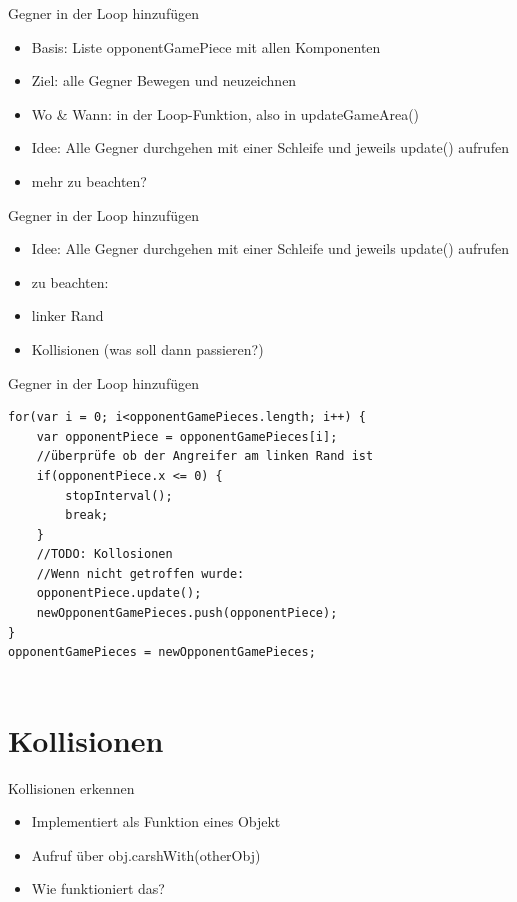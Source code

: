 \documentclass[18pt]{beamer}
\begin{document}
\begin{frame}{Gegner in der Loop hinzufügen}
\begin{itemize}
	\item Basis: Liste opponentGamePiece mit allen Komponenten
	\item Ziel: alle Gegner Bewegen und neuzeichnen 
	\item Wo \& Wann: in der Loop-Funktion, also in updateGameArea()
	\item Idee: Alle Gegner durchgehen mit einer Schleife und jeweils update() aufrufen
	\item mehr zu beachten? 
\end{itemize}
\end{frame}

\begin{frame}{Gegner in der Loop hinzufügen}
\begin{itemize}
	\item Idee: Alle Gegner durchgehen mit einer Schleife und jeweils update() aufrufen
	\item zu beachten:
	\item linker Rand
	\item Kollisionen (was soll dann passieren?) 
\end{itemize}
\end{frame}

\begin{frame}[fragile]{Gegner in der Loop hinzufügen}
\begin{lstlisting}	
for(var i = 0; i<opponentGamePieces.length; i++) {
	var opponentPiece = opponentGamePieces[i];
	//überprüfe ob der Angreifer am linken Rand ist
	if(opponentPiece.x <= 0) {
		stopInterval();
		break;
	}
	//TODO: Kollosionen
	//Wenn nicht getroffen wurde: 
	opponentPiece.update();
	newOpponentGamePieces.push(opponentPiece);
}
opponentGamePieces = newOpponentGamePieces;
	
\end{lstlisting}
\end{frame}

\section{Kollisionen}
\begin{frame}{Kollisionen erkennen}
\begin{itemize}
	\item Implementiert als Funktion eines Objekt
	\item Aufruf über obj.carshWith(otherObj)
	\item Wie funktioniert das?
\end{itemize}

\end{frame}
\end{document}
